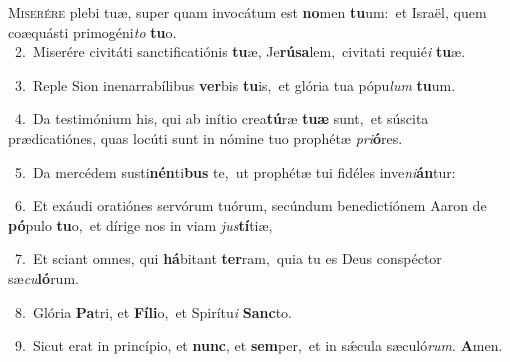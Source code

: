 \lettrine{\initial\textcolor{\initialcolor}{M}}{iserére} plebi tuæ, super quam invocátum est \textbf{no}\-men \textbf{tu}\-um:~\star et Israël, quem coæquásti primogéni\textit{to} \textbf{tu}\-o.\\
{\numbfont\textcolor{\numbcolor}{~2.}}~Miserére civitáti sanctificatiónis \textbf{tu}\-æ, Je\-\textbf{rú}\-\textbf{sa}lem,~\star civitati requié\textit{i} \textbf{tu}\-æ.\par
{\numbfont\textcolor{\numbcolor}{~3.}}~Reple Sion inenarrabílibus \textbf{ver}\-bis \textbf{tu}\-is,~\star et glória tua pópu\textit{lum} \textbf{tu}\-um.\par
{\numbfont\textcolor{\numbcolor}{~4.}}~Da testimónium his, qui ab inítio crea\-\textbf{tú}\-ræ \textbf{tu}\-\textbf{æ} sunt,~\star et súscita prædicatiónes, quas locúti sunt in nómine tuo prophétæ \textit{pri}\-\textbf{ó}res.\par
{\numbfont\textcolor{\numbcolor}{~5.}}~Da mercédem susti\-\textbf{nén}\-ti\textbf{bus} te,~\star ut prophétæ tui fidéles inve\-\textit{ni}\-\textbf{án}tur:\par
{\numbfont\textcolor{\numbcolor}{~6.}}~Et exáudi oratiónes servórum tuórum, secúndum benedictiónem Aaron de \textbf{pó}\-pulo \textbf{tu}\-o,~\star et dírige nos in viam \textit{jus}\-\textbf{tí}tiæ,\par
{\numbfont\textcolor{\numbcolor}{~7.}}~Et sciant omnes, qui \textbf{há}\-bitant \textbf{ter}\-ram,~\star quia tu es Deus conspéctor sæ\-\textit{cu}\-\textbf{ló}rum.\par
{\numbfont\textcolor{\numbcolor}{~8.}}~Glória \textbf{Pa}\-tri, et \textbf{Fí}\-\textbf{li}o,~\star et Spirítu\textit{i} \textbf{Sanc}\-to.\par
{\numbfont\textcolor{\numbcolor}{~9.}}~Sicut erat in princípio, et \textbf{nunc}\-, et \textbf{sem}\-per,~\star et in sǽcula sæculó\-\textit{rum}\-. \textbf{A}\-men.\par
